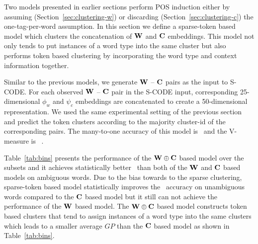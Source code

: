 Two models presented in earlier sections perform POS induction either
by assuming (Section~\ref{sec:clustering-w}) or discarding
(Section~\ref{sec:clustering-c}) the one-tag-per-word assumption.  In
this section we define a sparse-token based model which clusters the
concatenation of ${\bf W}$ and ${\bf C}$ embeddings.  This model not
only tends to put instances of a word type into the same cluster but
also performs token based clustering by incorporating the word type
and context information together.

Similar to the previous models, we generate ${\bf W}$ -- ${\bf C}$
pairs as the input to S-CODE.  For each observed ${\bf W}$ -- ${\bf
  C}$ pair in the S-CODE input, corresponding 25-dimensional $\phi_w$
and $\psi_c$ embeddings are concatenated to create a 50-dimensional
representation.  We used the same experimental setting of the previous
section and predict the token clusters according to the majority
cluster-id of the corresponding pairs.  The many-to-one accuracy of
this model is \wsxymto\ and the V-measure is \wsxyvm\ .

Table~\ref{tab:bins} presents the performance of the ${\bf
  W}\oplus{\bf C}$ based model over the subsets and it achieves
statistically better \mto\ than both of the ${\bf W}$ and ${\bf C}$
based models on ambiguous words.  Due to the bias towards to the
sparse clustering, sparse-token based model statistically improves the
\mto\ accuracy on unambiguous words compared to the ${\bf C}$ based
model but it still can not achieve the performance of the ${\bf W}$
based model.  The ${\bf W}\oplus{\bf C}$ based model constructs token
based clusters that tend to assign instances of a word type into the
same clusters which leads to a smaller average $GP$ than the ${\bf C}$
based model as shown in Table~\ref{tab:bins}.

